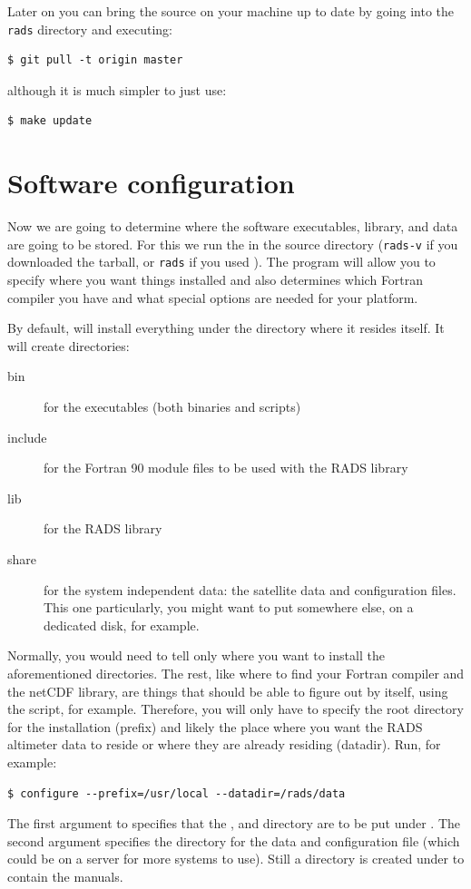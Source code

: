 \documentclass[a4paper,11pt,openany,natbib,nomargin]{thesis}
\begin{document}
Later on you can bring the source on your machine up to date by going into the \verb|rads| directory and
executing:
\begin{verbatim}
$ git pull -t origin master
\end{verbatim}
although it is much simpler to just use:
\begin{verbatim}
$ make update
\end{verbatim}

\section{Software configuration}
\label{sec:configuration}
Now we are going to determine where the software executables, library, and data are going to be stored. For this we run the  in the source directory (\texttt{\small rads-v\vernum} if you downloaded the tarball, or \verb|rads| if you used ). The program  will allow you to specify where you want things installed and also determines which Fortran compiler you have and what special options are needed for your platform.

By default,  will install everything under the directory where it resides itself. It will create directories:
\begin{description}
\item[bin] for the executables (both binaries and scripts)
\item[include] for the Fortran 90 module files to be used with the RADS library
\item[lib] for the RADS library
\item[share] for the system independent data: the satellite data and configuration files. This one particularly, you might want to put somewhere else, on a dedicated disk, for example.
\end{description}

Normally, you would need to tell  only where you want to install the aforementioned directories. The rest, like where to find your Fortran compiler and the netCDF library, are things that  should be able to figure out by itself, using the  script, for example. Therefore, you will only have to specify the root directory for the installation (prefix) and likely the place where you want the RADS altimeter data to reside or where they are already residing (datadir). Run, for example:
\begin{verbatim}
$ configure --prefix=/usr/local --datadir=/rads/data
\end{verbatim}
The first argument to  specifies that the ,  and  directory are to be put under . The second argument specifies the directory for the data and configuration file (which could be on a server for more systems to use). Still a directory  is created under  to contain the manuals.
\end{document}
